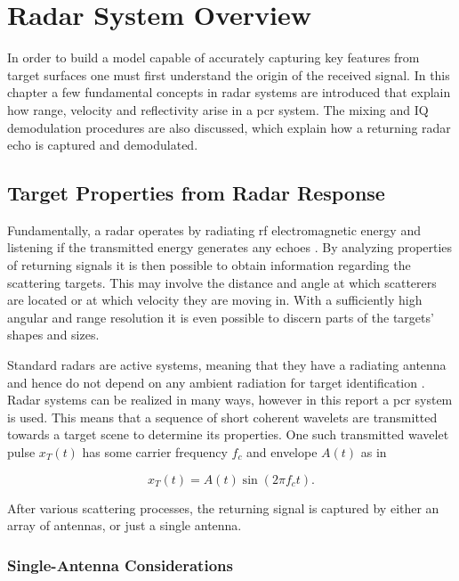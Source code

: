 \chapter{Radar System Overview}

In order to build a model capable of accurately capturing key features from target surfaces one must first understand the origin of the received signal. In this chapter a few fundamental concepts in radar systems are introduced that explain how range, velocity and reflectivity arise in a \gls{pcr} system. The mixing and IQ demodulation procedures are also discussed, which explain how a returning radar echo is captured and demodulated. 

\section{Target Properties from Radar Response}
Fundamentally, a radar operates by radiating \gls{rf} electromagnetic energy and listening if the transmitted energy generates any echoes \citep{skolnik_2009}. By analyzing properties of returning signals it is then possible to obtain information regarding the scattering targets. This may involve the distance and angle at which scatterers are located or at which velocity they are moving in. With a sufficiently high angular and range resolution it is even possible to discern parts of the targets' shapes and sizes.  

Standard radars are active systems, meaning that they have a radiating antenna and hence do not depend on any ambient radiation for target identification \citep{richards_2014}. Radar systems can be realized in many ways, however in this report a \gls{pcr} system is used. This means that a sequence of short coherent wavelets are transmitted towards a target scene to determine its properties. One such transmitted wavelet pulse $x_T(t)$ has some carrier frequency $f_c$ and envelope $A(t)$ as in

\begin{equation}\label{eq:trans}
	x_T(t)
	= A(t)\sin(2\pi f_c t).
\end{equation}

After various scattering processes, the returning signal is captured by either an array of antennas, or just a single antenna.

\subsection{Single-Antenna Considerations}


